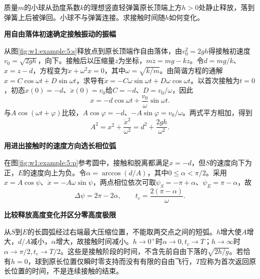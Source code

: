 \begin{question}\begin{example}[落球与弹簧的接触时间]\label{w1:example:5}
质量$m$的小球从劲度系数$k$的理想竖直轻弹簧原长顶端上方$h>0$处静止释放，落到弹簧上后被弹回。小球不与弹簧连接。求接触时间随$h$如何变化。
\end{example}
\end{question}
\begin{solution}\textbf{用自由落体初速确定接触振动的振幅}\par\nobreak
从图\ref{fig:w1:example:5:s}释放点到原长顶端作自由落体，由$v_0^2=2gh$得接触初速度$v_0=\sqrt{2gh}$，向下。接触后以压缩量$z$为坐标，$m\ddot z=mg-kz$。令$d=mg/k$、$x=z-d$，方程变为$\ddot x+\omega^2x=0$，其中$\omega=\sqrt{k/m}$。由简谐方程的通解$x=C\cos\omega t+D\sin\omega t$，求导有$\dot x=-C\omega\sin\omega t+D\omega\cos\omega t$。以首次接触为$t=0$，初态$x(0)=-d$、$\dot x(0)=v_0$给$C=-d$、$D=v_0/\omega$，因此
\[
x=-d\cos\omega t+\frac{v_0}{\omega}\sin\omega t.
\]
与$A\cos(\omega t+\varphi)$比较，$A\cos\varphi=-d$、$-A\sin\varphi=v_0/\omega$。两式平方相加，得到
\[
A^2=x^2+\frac{\dot x^2}{\omega^2}=d^2+\frac{2gh}{\omega^2}.
\]



\par\medskip{}\noindent\textbf{用进出接触时的速度方向选长相位弧}\par\nobreak
在图\ref{fig:w1:example:5:p}参考圆中，接触和脱离都满足$x=-d$，但$S$的速度向下为正，$E$的速度向上为负。令$\alpha=\arccos(d/A)$，其中$0\le\alpha<\pi/2$。采用$x=A\cos\psi$、$\dot x=-A\omega\sin\psi$，两点相位依次可取$\psi_S=-\pi+\alpha$、$\psi_E=\pi-\alpha$，故
\[
\Delta\psi=2\pi-2\alpha,\qquad
t_c=\frac{2(\pi-\alpha)}{\omega}.
\]


\par\medskip{}\noindent\textbf{比较释放高度变化并区分零高度极限}\par\nobreak
从$S$到$E$的长圆弧经过右端最大压缩位置，不能取两交点之间的短弧。$h$增大使$A$增大，$d/A$减小，$\alpha$增大，故接触时间减小。$h\to0^+$时$\alpha\to0,t_c\to T$；$h\to\infty$时$\alpha\to\pi/2,t_c\to T/2$。这些是接触阶段的时间，不含先前自由下落的$\sqrt{2h/g}$。若恰有$h=0$，球到原长位置仅瞬时零支持而没有有限的自由飞行，$T$应称为首次返回原长位置的时间，不是连续接触的结束。\end{solution}
